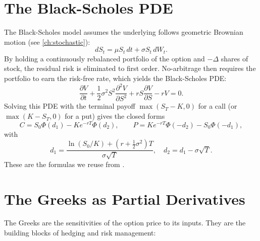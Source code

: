 \section{The Black-Scholes PDE}


The Black-Scholes model assumes the underlying follows geometric Brownian
motion (see \cref{ch:stochastic}):
\[
dS_t = \mu S_t \, dt + \sigma S_t \, dW_t.
\]
By holding a continuously rebalanced portfolio of the option and
$-\Delta$ shares of stock, the residual risk is eliminated to first order.
No-arbitrage then requires the portfolio to earn the risk-free rate,
which yields the Black-Scholes PDE:
\[
\frac{\partial V}{\partial t} + \frac{1}{2}\sigma^2 S^2
\frac{\partial^2 V}{\partial S^2} + r S \frac{\partial V}{\partial S}
- r V = 0.
\]
Solving this PDE with the terminal payoff $\max(S_T - K, 0)$ for a call
(or $\max(K - S_T, 0)$ for a put) gives the closed forms
\[
C = S_0 \Phi(d_1) - K e^{-rT} \Phi(d_2), \qquad
P = K e^{-rT} \Phi(-d_2) - S_0 \Phi(-d_1),
\]
with
\[
d_1 = \frac{\ln(S_0/K) + (r + \frac{1}{2}\sigma^2)T}{\sigma\sqrt{T}},
\quad d_2 = d_1 - \sigma\sqrt{T}.
\]
These are the formulas we reuse from .

\section{The Greeks as Partial Derivatives}


The Greeks are the sensitivities of the option price to its inputs. They
are the building blocks of hedging and risk management:

